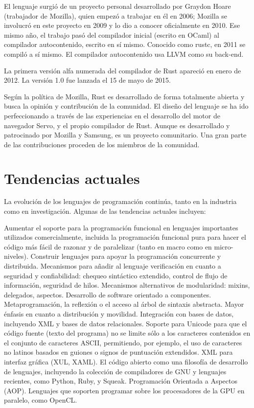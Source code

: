 \documentclass[twoside,twocolumn]{article}
\begin{document}
El lenguaje surgió de un proyecto personal desarrollado por Graydon Hoare (trabajador de Mozilla), quien empezó a trabajar en él en 2006; Mozilla se involucró en este proyecto en 2009​ y lo dio a conocer oficialmente en 2010.​ Ese mismo año, el trabajo pasó del compilador inicial (escrito en OCaml) al compilador autocontenido, escrito en sí mismo.​ Conocido como rustc, en 2011 se compiló a sí mismo.​ El compilador autocontenido usa LLVM como su back-end.

La primera versión alfa numerada del compilador de Rust apareció en enero de 2012.​ La versión 1.0 fue lanzada el 15 de mayo de 2015.

Según la política de Mozilla, Rust es desarrollado de forma totalmente abierta y busca la opinión y contribución de la comunidad. El diseño del lenguaje se ha ido perfeccionando a través de las experiencias en el desarrollo del motor de navegador Servo,​ y el propio compilador de Rust. Aunque es desarrollado y patrocinado por Mozilla y Samsung, es un proyecto comunitario. Una gran parte de las contribuciones proceden de los miembros de la comunidad.


\section{Tendencias actuales}

La evolución de los lenguajes de programación continúa, tanto en la industria como en investigación. Algunas de las tendencias actuales incluyen:

    Aumentar el soporte para la programación funcional en lenguajes importantes utilizados comercialmente, incluida la programación funcional pura para hacer el código más fácil de razonar y de paralelizar (tanto en macro como en micro-niveles).
    Construir lenguajes para apoyar la programación concurrente y distribuida.
    Mecanismos para añadir al lenguaje verificación en cuanto a seguridad y confiabilidad: chequeo sintáctico extendido, control de flujo de información, seguridad de hilos.
    Mecanismos alternativos de modularidad: mixins, delegados, aspectos.
    Desarrollo de software orientado a componentes.
    Metaprogramación, la reflexión o el acceso al árbol de sintaxis abstracta.
    Mayor énfasis en cuanto a distribución y movilidad.
    Integración con bases de datos, incluyendo XML y bases de datos relacionales.
    Soporte para Unicode para que el código fuente (texto del programa) no se limite sólo a los caracteres contenidos en el conjunto de caracteres ASCII, permitiendo, por ejemplo, el uso de caracteres no latinos basados en guiones o signos de puntuación extendidos.
    XML para interfaz gráfica (XUL, XAML).
    El código abierto como una filosofía de desarrollo de lenguajes, incluyendo la colección de compiladores de GNU y lenguajes recientes, como Python, Ruby, y Squeak.
    Programación Orientada a Aspectos (AOP).
    Lenguajes que soporten programar sobre los procesadores de la GPU en paralelo, como OpenCL.
\end{document}

